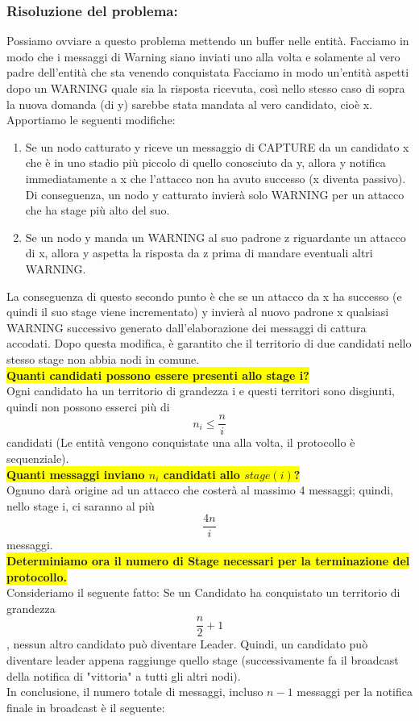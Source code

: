 \subsubsection{Risoluzione del problema:}
Possiamo ovviare a questo problema mettendo un buffer nelle entità.
Facciamo in modo che i messaggi di Warning siano inviati uno alla volta e solamente al vero padre dell'entità che sta venendo conquistata
Facciamo in modo un'entità aspetti dopo un WARNING quale sia la risposta ricevuta, così nello stesso caso di sopra la nuova domanda (di y) sarebbe stata mandata al vero candidato, cioè x.\\
Apportiamo le seguenti modifiche:
\begin{enumerate}
\item Se un nodo catturato y riceve un messaggio di CAPTURE da un candidato x che è in uno stadio più piccolo di quello conosciuto da y, allora y notifica immediatamente a x che l'attacco non ha avuto successo (x diventa passivo). Di conseguenza, un nodo y catturato invierà solo WARNING per un attacco che ha stage più alto del suo. 
\item Se un nodo y manda un WARNING al suo padrone z riguardante un attacco di x, allora y aspetta la risposta da z prima di mandare eventuali altri WARNING.
\end{enumerate}
La conseguenza di questo secondo punto è che se un attacco da x ha successo (e quindi il suo stage viene incrementato) y invierà al nuovo padrone x qualsiasi WARNING successivo generato dall'elaborazione dei messaggi di cattura accodati. Dopo questa modifica, è garantito che il territorio di due candidati nello stesso stage non abbia nodi in comune.\\
\colorbox{yellow}{\textbf{Quanti candidati possono essere presenti allo stage i?}}\\
Ogni candidato ha un territorio di grandezza i e questi territori sono disgiunti, quindi non possono esserci più di $$n_i \leq \frac{n}{i}$$ candidati (Le entità vengono conquistate una alla volta, il protocollo è sequenziale). \\
\colorbox{yellow}{\textbf{Quanti messaggi inviano $n_i$ candidati allo $stage(i)$?}}\\
Ognuno darà origine ad un attacco che costerà al massimo 4 messaggi; quindi, nello stage i, ci saranno al più $$\frac{4n}{i}$$ messaggi. \\
\colorbox{yellow}{\textbf{Determiniamo ora il numero di Stage necessari per la terminazione del protocollo.}} \\
Consideriamo il seguente fatto: Se un Candidato ha conquistato un territorio di grandezza $$\frac{n}{2} +1$$, nessun altro candidato può diventare Leader. Quindi, un candidato può diventare leader appena raggiunge quello stage (successivamente fa il broadcast della notifica di "vittoria" a tutti gli altri nodi).\\
In conclusione, il numero totale di messaggi, incluso $n-1$ messaggi per la notifica finale in broadcast è il seguente:

